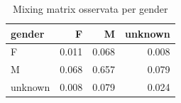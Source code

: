 \begin{table}
\centering
\caption{Mixing matrix osservata per gender}
\label{tab:t3_mixing_gender_osservata}
\begin{tabular}{lrrr}
\toprule
 gender &     F &     M &  unknown \\
\midrule
      F & 0.011 & 0.068 &    0.008 \\
      M & 0.068 & 0.657 &    0.079 \\
unknown & 0.008 & 0.079 &    0.024 \\
\bottomrule
\end{tabular}
\end{table}
